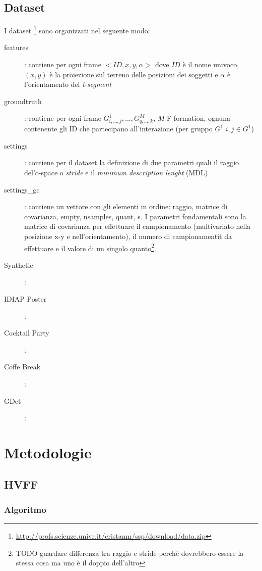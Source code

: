 \documentclass[8pt,twocolumn]{article}
\begin{document}
	
	\subsection{Dataset}
	I dataset \footnote{\url{http://profs.scienze.univr.it/cristanm/ssp/download/data.zip}} sono organizzati nel seguente modo:
	\begin{description}
	    \item [features]: contiene per ogni frame $<ID,x,y,\alpha>$ dove $ID$ è il nome univoco, $(x,y)$ è la proiezione sul terreno delle posizioni dei soggetti e $\alpha$ è l'orientamento del \textit{t-segment}
	    \item [groundtruth]: contiene per ogni frame $G_{i,...,j}^1,...,G_{q,...,k}^M$, $M$ F-formation, ognuna contenente gli ID che partecipano all'interazione (per gruppo $G^1$ $i,j \in G^1$)
	    \item [settings]: contiene per il dataset la definizione di due parametri quali il raggio del'o-space o \textit{stride} e il \textit{minimum description lenght}  (MDL)
	    \item [settings\_gc]: contiene un vettore con gli elementi in ordine: raggio, matrice di covarianza, empty, nsamples, quant, s. I parametri fondamentali sono la matrice di covarianza per effettuare il campionamento (multivariato nella posizione x-y e nell'orientamento), il numero di campionamentit da effettuare e il valore di un singolo quanto\footnote{TODO guardare differenza tra raggio e stride perchè dovrebbero essere la stessa cosa ma uno è il doppio dell'altro}.
	\end{description}
	\begin{description}
	\item [Synthetic]: 
	\item [IDIAP Poster]:
	\item [Cocktail Party]:
	\item [Coffe Break]:
	\item [GDet]:
	\end{description}
	
	
	\section{Metodologie}
	\subsection{HVFF}
    \subsubsection{Algoritmo}
\end{document}
